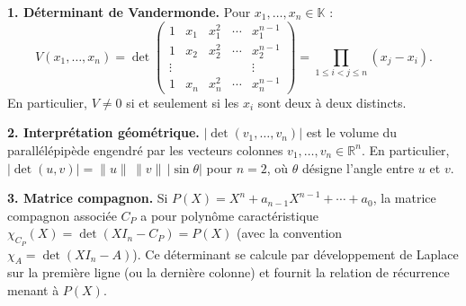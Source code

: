 \decsep{}



\begin{mdframed}[style=exbar]
  \textbf{1. Déterminant de Vandermonde.}\enspace%
  Pour $x_1,\ldots,x_n \in \mathbb{K}$ :
  \[
    V(x_1,\ldots,x_n) =
    \det\begin{pmatrix}
      1 & x_1 & x_1^2 & \cdots & x_1^{n-1}\\
      1 & x_2 & x_2^2 & \cdots & x_2^{n-1}\\
      \vdots&&&&\vdots\\
      1 & x_n & x_n^2 & \cdots & x_n^{n-1}
    \end{pmatrix}
    = \prod_{1\leq i<j\leq n}(x_j - x_i).
  \]
  En particulier, $V\neq 0$ si et seulement si les $x_i$ sont deux à deux distincts.

  \smallskip\noindent
  \textbf{2. Interprétation géométrique.}\enspace%
  $|\det(v_1,\ldots,v_n)|$ est le volume du parallélépipède engendré par
  les vecteurs colonnes $v_1,\ldots,v_n \in \mathbb{R}^n$.
  En particulier, $|\det(u,v)| = \|u\|\,\|v\|\,|\sin\theta|$ pour $n=2$,
  où $\theta$ désigne l'angle entre $u$ et $v$.

  \smallskip\noindent
  \textbf{3. Matrice compagnon.}\enspace%
  Si $P(X) = X^n + a_{n-1}X^{n-1} + \cdots + a_0$, la matrice compagnon
  associée $C_P$ a pour polynôme caractéristique $\chi_{C_P}(X) = \det(XI_n - C_P) = P(X)$
  (avec la convention $\chi_A = \det(XI_n - A)$).
  Ce déterminant se calcule par développement de Laplace
  sur la première ligne (ou la dernière colonne) et fournit la relation
  de récurrence menant à $P(X)$.
\end{mdframed}

\vspace{6pt}

